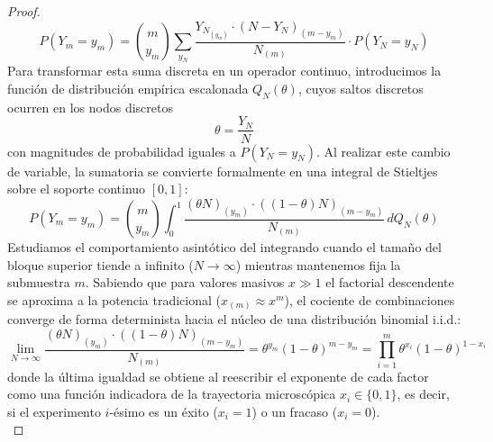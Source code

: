 \begin{teo}
\begin{proof}
\begin{equation*}
        P(Y_m = y_m) = \binom{m}{y_m} \sum_{y_N} \frac{Y_{N_{(y_m)}} \cdot (N - Y_N)_{(m - y_m)}}{N_{(m)}} \cdot P(Y_N = y_N)
    \end{equation*}
    Para transformar esta suma discreta en un operador continuo, introducimos la función de distribución empírica escalonada $Q_N(\theta)$, cuyos saltos discretos ocurren en los nodos discretos 
    $$\theta = \frac{Y_N}{N}$$ 
    con magnitudes de probabilidad iguales a $P(Y_N = y_N)$. Al realizar este cambio de variable, la sumatoria se convierte formalmente en una integral de Stieltjes sobre el soporte continuo $[0, 1]$:
    \begin{equation*}
        P(Y_m = y_m) = \binom{m}{y_m} \int_{0}^{1} \frac{(\theta N)_{(y_m)} \cdot ((1 - \theta) N)_{(m - y_m)}}{N_{(m)}} \, dQ_N(\theta)
    \end{equation*}
    Estudiamos el comportamiento asintótico del integrando cuando el tamaño del bloque superior tiende a infinito ($N \to \infty$) mientras mantenemos fija la submuestra $m$. Sabiendo que para valores masivos $x \gg 1$ el factorial descendente se aproxima a la potencia tradicional ($x_{(m)} \approx x^m$), el cociente de combinaciones converge de forma determinista hacia el núcleo de una distribución binomial i.i.d.:
    \begin{equation*}
        \lim_{N \to \infty} \frac{(\theta N)_{(y_m)} \cdot ((1 - \theta) N)_{(m - y_m)}}{N_{(m)}} = \theta^{y_m} (1 - \theta)^{m - y_m} = \prod_{i=1}^{m} \theta^{x_i} (1 - \theta)^{1 - x_i}
    \end{equation*}
    donde la última igualdad se obtiene al reescribir el exponente de cada factor como una función indicadora de la trayectoria microscópica $x_i \in \{0, 1\}$, es decir, si el experimento $i$-ésimo es un éxito ($x_i = 1$) o un fracaso ($x_i = 0$). \\


\end{proof}
\end{teo}
